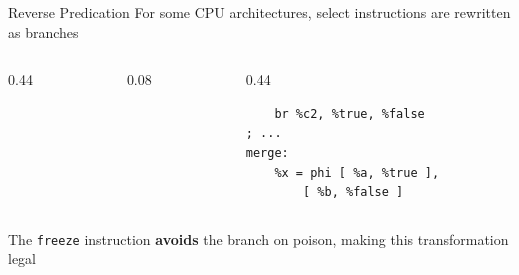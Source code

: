 \begin{frame}[fragile]{Reverse Predication}
For some CPU architectures, select instructions are rewritten as branches 
    \begin{columns}[c]
        \begin{column}{0.44\textwidth}
            \begin{lstlisting}[style=llvmmono]
%x = select %c, %a, %b
            \end{lstlisting}
        \end{column}
        \begin{column}{0.08\textwidth}
            \transform
        \end{column}
        \begin{column}{0.44\textwidth}
            \begin{lstlisting}[style=llvmmono]
    %c2 = freeze %c
    br %c2, %true, %false
; ...
merge:
    %x = phi [ %a, %true ],
        [ %b, %false ]

            \end{lstlisting}
        \end{column}
    \end{columns}
    The \texttt{freeze} instruction \textbf{avoids} the branch on poison, making this transformation legal


\end{frame}
